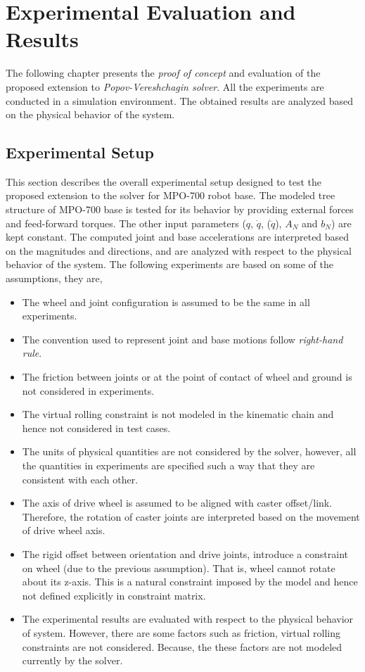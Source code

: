 
\chapter{Experimental Evaluation and Results}

The following chapter presents the \textit{proof of concept} and evaluation of the proposed extension to \textit{Popov-Vereshchagin solver}. All the experiments are conducted in a simulation environment. The obtained results are analyzed based on the physical behavior of the system. 


\section{Experimental Setup}
This section describes the overall experimental setup designed to test the proposed extension to the solver for MPO-700 robot base. The modeled tree structure of MPO-700 base is tested for its behavior by providing external forces and feed-forward torques. The other input parameters ($q$, $\dot{q}$, ($\ddot{q}$), $A_N$ and $b_N$) are kept constant. The computed joint and base accelerations are interpreted based on the magnitudes and directions, and are analyzed with respect to the physical behavior of the system. The following experiments are based on some of the assumptions, they are,

\begin{itemize}
	\item The wheel and joint configuration is assumed to be the same in all experiments.  
	\item The convention used to represent joint and base motions follow \textit{right-hand rule}.
	\item The friction between joints or at the point of contact of wheel and ground is not considered in experiments.
	\item The virtual rolling constraint is not modeled in the kinematic chain and hence not considered in test cases.
	\item The units of physical quantities are not considered by the solver, however, all the quantities in experiments are specified such a way that they are consistent with each other.
	\item The axis of drive wheel is assumed to be aligned with caster offset/link. Therefore, the rotation of caster joints are interpreted based on the movement of drive wheel axis.
	\item The rigid offset between orientation and drive joints, introduce a constraint on wheel (due to the previous assumption). That is, wheel cannot rotate about its z-axis. This is a natural constraint imposed by the model and hence not defined explicitly in constraint matrix.
	\item The experimental results are evaluated with respect to the physical behavior of system. However, there are some factors such as friction, virtual rolling constraints are not considered. Because, the these factors are not modeled currently by the solver. 
\end{itemize}

